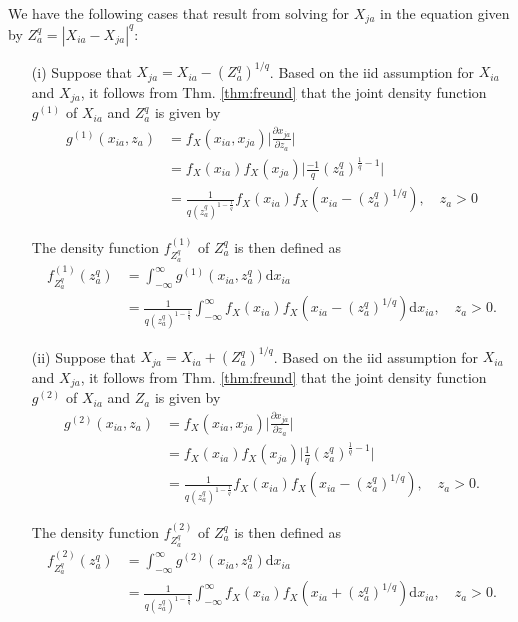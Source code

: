 \documentclass[aoas]{imsart}
\begin{document}
We have the following cases that result from solving for $X_{ja}$ in the equation given by $Z^q_a = |X_{ia} - X_{ja}|^q$:
\begin{itemize}
	\item[(i)] Suppose that $X_{ja} = X_{ia} - \left(Z^q_a\right)^{1/q}$. Based on the iid assumption for $X_{ia}$ and $X_{ja}$, it follows from Thm. \ref{thm:freund} that the joint density function $g^{(1)}$ of $X_{ia}$ and $Z^q_a$ is given by
	\begin{equation}
	\begin{aligned}
	g^{(1)}(x_{ia},z_a) &= f_X(x_{ia},x_{ja})\biggl|\frac{\partial x_{ja}}{\partial z_a}\biggr| \\
	&= f_X(x_{ia})f_X(x_{ja})\biggl|\frac{-1}{q} \left(z^q_a\right)^{\frac{1}{q}-1}\biggr| \\
	&= \frac{1}{q \left(z^q_a\right)^{1 - \frac{1}{q}}}f_X(x_{ia})f_X\left(x_{ia}-\left(z^q_a\right)^{1/q}\right), \quad z_a > 0
	\end{aligned}
	\end{equation}
	
	The density function $f^{(1)}_{Z^q_a}$ of $Z^q_a$ is then defined as
	\begin{equation}
	\begin{aligned}
	f^{(1)}_{Z^q_a}(z^q_a) &= \int_{-\infty}^{\infty} g^{(1)}(x_{ia},z^q_a)\text{d}x_{ia} \\
	&= \frac{1}{q \left(z^q_a\right)^{1 - \frac{1}{q}}}\int_{-\infty}^{\infty} f_X(x_{ia})f_X\left(x_{ia}-\left(z^q_a\right)^{1/q}\right)\text{d}x_{ia}, \quad z_a > 0.
	\end{aligned}
	\end{equation}
	
	\item[(ii)] Suppose that $X_{ja} = X_{ia} + \left(Z^q_a\right)^{1/q}$. Based on the iid assumption for $X_{ia}$ and $X_{ja}$, it follows from Thm. \ref{thm:freund} that the joint density function $g^{(2)}$ of $X_{ia}$ and $Z_a$ is given by
	\begin{equation}
	\begin{aligned}
	g^{(2)}(x_{ia},z_a) &= f_X(x_{ia},x_{ja})\biggl|\frac{\partial x_{ja}}{\partial z_a}\biggr| \\
	&= f_X(x_{ia})f_X(x_{ja})\biggl|\frac{1}{q} \left(z^q_a\right)^{\frac{1}{q}-1}\biggr| \\
	&= \frac{1}{q \left(z^q_a\right)^{1 - \frac{1}{q}}}f_X(x_{ia})f_X\left(x_{ia}-\left(z^q_a\right)^{1/q}\right), \quad z_a > 0.
	\end{aligned}
	\end{equation}
	
	The density function $f^{(2)}_{Z^q_a}$ of $Z^q_a$ is then defined as
	\begin{equation}
	\begin{aligned}
	f^{(2)}_{Z^q_a}(z^q_a) &= \int_{-\infty}^{\infty} g^{(2)}(x_{ia},z^q_a)\text{d}x_{ia} \\
	&= \frac{1}{q \left(z^q_a\right)^{1 - \frac{1}{q}}}\int_{-\infty}^{\infty} f_X(x_{ia})f_X\left(x_{ia}+\left(z^q_a\right)^{1/q}\right)\text{d}x_{ia}, \quad z_a > 0.
	\end{aligned}
	\end{equation}
\end{itemize}
\end{document}
